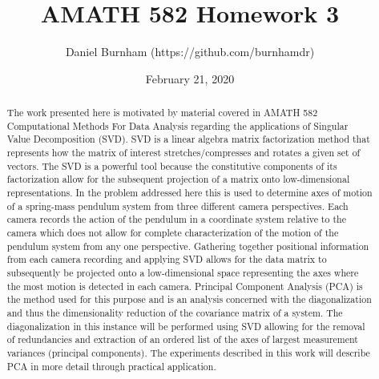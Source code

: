\documentclass{article}
\title{AMATH 582 Homework 3}
\author{Daniel Burnham (https://github.com/burnhamdr)}
\date{February 21, 2020}
\begin{document}
\maketitle

\begin{abstract}
The work presented here is motivated by material covered in AMATH 582 Computational Methods For Data Analysis regarding the applications of Singular Value Decomposition (SVD). SVD is a linear algebra matrix factorization method that represents how the matrix of interest stretches/compresses and rotates a given set of vectors. The SVD is a powerful tool because the constitutive components of its factorization allow for the subsequent projection of a matrix onto low-dimensional representations. In the problem addressed here this is used to determine axes of motion of a spring-mass pendulum system from three different camera perspectives. Each camera records the action of the pendulum in a coordinate system relative to the camera which does not allow for complete characterization of the motion of the pendulum system from any one perspective. Gathering together positional information from each camera recording and applying SVD allows for the data matrix to subsequently be projected onto a low-dimensional space representing the axes where the most motion is detected in each camera. Principal Component Analysis (PCA) is the method used for this purpose and is an analysis concerned with the diagonalization and thus the dimensionality reduction of the covariance matrix of a system. The diagonalization in this instance will be performed using SVD allowing for the removal of redundancies and extraction of an ordered list of the axes of largest measurement variances (principal components). The experiments described in this work will describe PCA in more detail through practical application.
\end{abstract}

\end{document}
